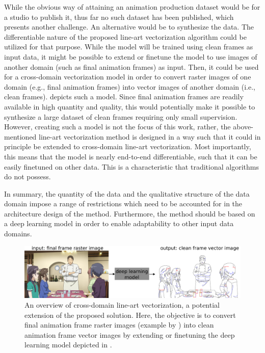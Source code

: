 While the obvious way of attaining an animation production dataset would be for a studio to publish it, thus far no such dataset has been published, which presents another challenge. An alternative would be to synthesize the data. The differentiable nature of the proposed line-art vectorization algorithm could be utilized for that purpose. While the model will be trained using clean frames as input data, it might be possible to extend or finetune the model to use images of another domain (such as final animation frames) as input. Then, it could be used for a cross-domain vectorization model in order to convert raster images of one domain (e.g., final animation frames) into vector images of another domain (i.e., clean frames).  depicts such a model. Since final animation frames are readily available in high quantity and quality, this would potentially make it possible to synthesize a large dataset of clean frames requiring only small supervision. However, creating such a model is not the focus of this work, rather, the above-mentioned line-art vectorization method is designed in a way such that it could in principle be extended to cross-domain line-art vectorization. Most importantly, this means that the model is nearly end-to-end differentiable, such that it can be easily finetuned on other data. This is a characteristic that traditional algorithms \citep{Selinger03potrace:a, autotrace, 10.1145/2421636.2421640} do not possess.

In summary, the quantity of the data and the qualitative structure of the data domain impose a range of restrictions which need to be accounted for in the architecture design of the method. Furthermore, the method should be based on a deep learning model in order to enable adaptability to other input data domains.

\begin{figure}
    \centering
    \includegraphics[width=\textwidth]{graphics/cross-domain-overview.pdf}
    \caption{An overview of cross-domain line-art vectorization, a potential extension of the proposed solution. Here, the objective is to convert final animation frame raster images (example by \citet{sakura-quest}) into clean animation frame vector images by extending or finetuning the deep learning model depicted in .}
    \label{fig:cross-domain-overview}
\end{figure}

